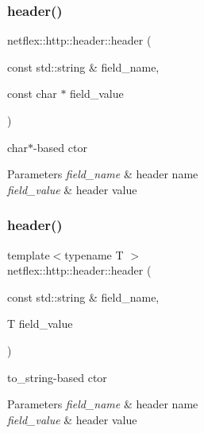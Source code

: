 \subsubsection{\texorpdfstring{header()}{header()}\hspace{0.1cm}{\footnotesize\ttfamily [2/3]}}
{\footnotesize\ttfamily netflex\+::http\+::header\+::header (\begin{DoxyParamCaption}\item[{const std\+::string \&}]{field\+\_\+name,  }\item[{const char $\ast$}]{field\+\_\+value }\end{DoxyParamCaption})}

char$\ast$-\/based ctor


\begin{DoxyParams}{Parameters}
{\em field\+\_\+name} & header name \\
\hline
{\em field\+\_\+value} & header value \\
\hline
\end{DoxyParams}
\mbox{\label{structnetflex_1_1http_1_1header_af5e35e57c8210a0927908f8e96598083}} 
\subsubsection{\texorpdfstring{header()}{header()}\hspace{0.1cm}{\footnotesize\ttfamily [3/3]}}
{\footnotesize\ttfamily template$<$typename T $>$ \\
netflex\+::http\+::header\+::header (\begin{DoxyParamCaption}\item[{const std\+::string \&}]{field\+\_\+name,  }\item[{T}]{field\+\_\+value }\end{DoxyParamCaption})\hspace{0.3cm}{\ttfamily [inline]}}

to\+\_\+string-\/based ctor


\begin{DoxyParams}{Parameters}
{\em field\+\_\+name} & header name \\
\hline
{\em field\+\_\+value} & header value \\
\hline
\end{DoxyParams}


